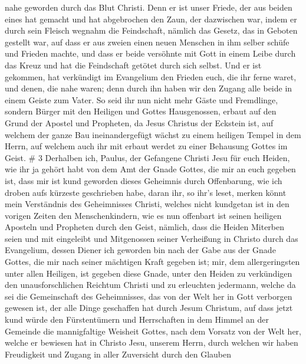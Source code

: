 nahe geworden durch das Blut Christi.  Denn er ist unser
Friede, der aus beiden eines hat gemacht und hat abgebrochen den Zaun,
der dazwischen war, indem er durch sein Fleisch wegnahm die Feindschaft,
 nämlich das Gesetz, das in Geboten gestellt war, auf dass
er aus zweien einen neuen Menschen in ihm selber schüfe und Frieden
machte,  und dass er beide versöhnte mit Gott in einem
Leibe durch das Kreuz und hat die Feindschaft getötet durch sich selbst.
 Und er ist gekommen, hat verkündigt im Evangelium den
Frieden euch, die ihr ferne waret, und denen, die nahe waren;
 denn durch ihn haben wir den Zugang alle beide in einem
Geiste zum Vater.  So seid ihr nun nicht mehr Gäste und
Fremdlinge, sondern Bürger mit den Heiligen und Gottes Hausgenossen,
 erbaut auf den Grund der Apostel und Propheten, da Jesus
Christus der Eckstein ist,  auf welchem der ganze Bau
ineinandergefügt wächst zu einem heiligen Tempel in dem Herrn,
 auf welchem auch ihr mit erbaut werdet zu einer Behausung
Gottes im Geist. \# 3  Derhalben ich, Paulus, der Gefangene
Christi Jesu für euch Heiden,  wie ihr ja gehört habt von
dem Amt der Gnade Gottes, die mir an euch gegeben ist,  dass
mir ist kund geworden dieses Geheimnis durch Offenbarung, wie ich droben
aufs kürzeste geschrieben habe,  daran ihr, so ihr's leset,
merken könnt mein Verständnis des Geheimnisses Christi, 
welches nicht kundgetan ist in den vorigen Zeiten den Menschenkindern,
wie es nun offenbart ist seinen heiligen Aposteln und Propheten durch
den Geist,  nämlich, dass die Heiden Miterben seien und mit
eingeleibt und Mitgenossen seiner Verheißung in Christo durch das
Evangelium,  dessen Diener ich geworden bin nach der Gabe
aus der Gnade Gottes, die mir nach seiner mächtigen Kraft gegeben ist;
 mir, dem allergeringsten unter allen Heiligen, ist gegeben
diese Gnade, unter den Heiden zu verkündigen den unausforschlichen
Reichtum Christi  und zu erleuchten jedermann, welche da sei
die Gemeinschaft des Geheimnisses, das von der Welt her in Gott
verborgen gewesen ist, der alle Dinge geschaffen hat durch Jesum
Christum,  auf dass jetzt kund würde den Fürstentümern und
Herrschaften in dem Himmel an der Gemeinde die mannigfaltige Weisheit
Gottes,  nach dem Vorsatz von der Welt her, welche er
bewiesen hat in Christo Jesu, unserem Herrn,  durch welchen
wir haben Freudigkeit und Zugang in aller Zuversicht durch den Glauben
